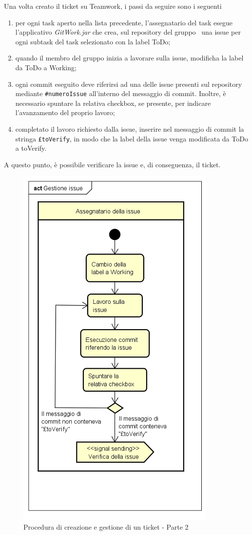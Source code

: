 \documentclass[../NormeProgetto.tex]{subfiles}
\begin{document}
			Una volta creato il ticket su Teamwork, i passi da seguire sono i seguenti			
				\begin{enumerate}
					\item per ogni task aperto nella lista precedente, l'assegnatario del task esegue l'applicativo \textit{GitWork.jar} che crea, sul repository del gruppo \leaf\, una issue per ogni subtask del task selezionato con la label ToDo;
					\item quando il membro del gruppo inizia a lavorare sulla issue, modificha la label da ToDo a Working;
					\item ogni commit eseguito deve riferirsi ad una delle issue presenti sul repository mediante \texttt{\#numeroIssue} all'interno del messaggio di commit. Inoltre, è necessario spuntare la relativa checkbox, se presente, per indicare l'avanzamento del proprio lavoro;
					\item completato il lavoro richiesto dalla issue, inserire nel messaggio di commit la stringa \texttt{£toVerify}, in modo che la label della issue venga modificata da ToDo a toVerify.
				\end{enumerate}
			A questo punto, è possibile verificare la issue e, di conseguenza, il ticket.
				\begin{figure}[H]
					\centering
					\includegraphics[scale=0.9]{sections/img/lavoroSuIssue.png}
					\caption{Procedura di creazione e gestione di un ticket - Parte 2}\label{fig:Procedura di creazione e gestione di un ticket - Parte 2} 
				\end{figure}
\end{document}
